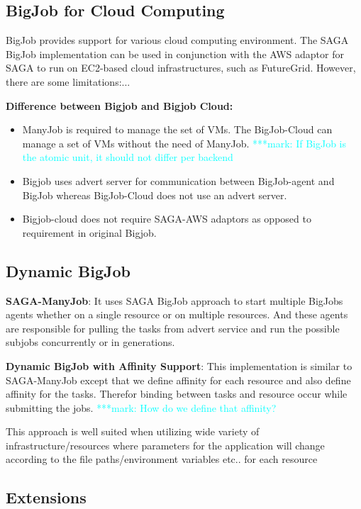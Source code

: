 \documentclass[]{article}
\newcommand{\msnote}[1]{ {\textcolor{cyan} { ***mark: #1 }}}
\begin{document}
\subsection{BigJob for Cloud Computing}

BigJob provides support for various cloud computing environment. The SAGA BigJob
implementation can be used in conjunction with the AWS adaptor for SAGA to run
on EC2-based cloud infrastructures, such as FutureGrid. However, there are some 
limitations:...

\textbf{Difference between Bigjob and Bigjob Cloud:} 

\begin{itemize}
	\item ManyJob is required to manage the set of VMs. The BigJob-Cloud can manage a set of VMs without the need of ManyJob.
	\msnote{If BigJob is the atomic unit, it should not differ per backend}
	\item Bigjob uses advert server for communication between BigJob-agent and BigJob whereas BigJob-Cloud does not use an advert server.
	\item Bigjob-cloud does not require SAGA-AWS adaptors as opposed to requirement in original Bigjob. 
\end{itemize}	


\subsection{Dynamic BigJob}

\textbf{SAGA-ManyJob}:
It uses SAGA BigJob approach to start multiple BigJobs agents 
whether on a single resource or on multiple resources. And 
these agents are responsible for pulling the tasks from advert 
service and run the possible subjobs concurrently or in generations.



\textbf{Dynamic BigJob with Affinity Support}:
This implementation is similar to SAGA-ManyJob except that we define affinity for each resource and also define affinity for the tasks. Therefor binding between tasks and resource occur while submitting the jobs.
\msnote{How do we define that affinity?}

This approach is well suited when utilizing wide variety of infrastructure/resources where parameters for the application will change according to the file paths/environment variables etc.. for each resource

\subsection{Extensions}
\end{document}
